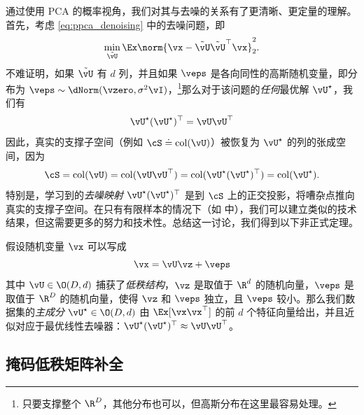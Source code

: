 \documentclass[../../book-main_zh.tex]{subfiles}
\begin{document}
\begin{remark}
    通过使用 PCA 的概率视角，我们对其与去噪的关系有了更清晰、更定量的理解。首先，考虑
    \eqref{eq:ppca_denoising} 中的去噪问题，即
    \begin{equation}
        \min_{\tilde{\vU}}\Ex\norm{\vx -
        \tilde{\vU}\tilde{\vU}^{\top}\vx}_{2}^{2}.
    \end{equation}
    不难证明，如果 $\tilde{\vU}$ 有 $d$ 列，并且如果 \(\veps\) 是各向同性的高斯随机变量，即分布为
    \(\veps \sim \dNorm(\vzero,
    \sigma^{2}\vI)\)，\footnote{只要支撑整个
    \(\R^{D}\)，其他分布也可以，但高斯分布在这里最容易处理。}那么对于该问题的\textit{任何}最优解 \(\vU^{\star}\)，我们有
    \begin{equation}
        \vU^{\star}(\vU^{\star})^{\top} = \vU\vU^{\top}
    \end{equation}
    因此，真实的支撑子空间（例如 \(\cS \doteq
    \mathop{\mathrm{col}}(\vU)\)）被恢复为 \(\vU^{\star}\) 的列的张成空间，因为
    \begin{equation}
        \cS = \mathop{\mathrm{col}}(\vU) = \mathop{\mathrm{col}}(\vU\vU^{\top})
        = \mathop{\mathrm{col}}(\vU^{\star}(\vU^{\star})^{\top})
        = \mathop{\mathrm{col}}(\vU^{\star}).
    \end{equation}
    特别是，学习到的\textit{去噪映射} \(\vU^{\star}(\vU^{\star})^{\top}\) 是到
    \(\cS\) 上的正交投影，将嘈杂点推向真实的支撑子空间。在只有有限样本的情况下（如 
    中），我们可以建立类似的技术结果，但这需要更多的努力和技术性。总结这一讨论，我们得到以下非正式定理。
\end{remark}

\begin{theorem}\label{thm:ppca}
    假设随机变量 \(\vx\) 可以写成
    \begin{equation}
        \vx = \vU\vz + \veps
    \end{equation}
    其中 \(\vU \in \O(D, d)\) 捕获了\textit{低秩结构}，\(\vz\) 是取值于 \(\R^{d}\)
    的随机向量，\(\veps\) 是取值于 \(\R^{D}\) 的随机向量，使得 \(\vz\) 和 \(\veps\) 独立，且
    \(\veps\) 较小。那么我们数据集的\textit{主成分} \(\vU^{\star} \in \O(D, d)\) 由
    \(\Ex[\vx\vx^{\top}]\) 的前 \(d\)
    个特征向量给出，并且近似对应于最优线性去噪器：\(\vU^{\star}(\vU^{\star})^{\top}
    \approx \vU\vU^{\top}\)。
\end{theorem}

\subsection{掩码低秩矩阵补全}
\end{document}
